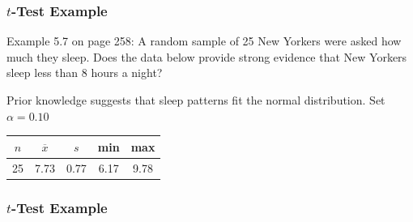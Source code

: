 \documentclass[handout]{beamer}
\newcommand{\blue}[1]{\textcolor{blue2}{#1}}
\newcommand{\xbar}{\overline{x}}
\begin{document}
\begin{frame}
\frametitle{$t$-Test Example}

Example 5.7 on page 258:  A random sample of 25 New Yorkers were asked how much they sleep.  Does the data below provide strong evidence that New Yorkers sleep less than 8 hours a night?  

Prior knowledge suggests that sleep patterns fit the normal distribution.  Set $\alpha=0.10$

\vspace{0.5cm}
\begin{center}
\begin{tabular}{c|c|c|c|c}
$n$ & $\xbar$ & $s$ & min & max\\
\hline
25 & 7.73 & 0.77 & 6.17 & 9.78\\
\end{tabular}
\end{center}

\end{frame}


\begin{frame}
\frametitle{$t$-Test Example}
%
%
%
%
\end{frame}
\end{document}
